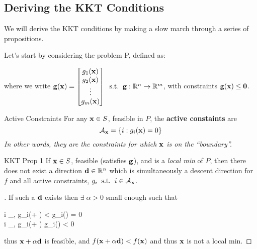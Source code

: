 \subsection{Deriving the KKT Conditions}

We will derive the KKT conditions by making a slow march through
a series of propositions.

Let's start by considering the problem P, defined as:

where we write $\mathbf{g}(\mathbf{x}) = \begin{bmatrix} g_1(\mathbf{x}) \\ g_2(\mathbf{x}) \\ \vdots \\ g_m(\mathbf{x}) \end{bmatrix} 
\;\; \text{s.t.} \;\; \mathbf{g}: \mathbb{R}^n \rightarrow \mathbb{R}^m$, with constraints $\mathbf{g}(\mathbf{x}) \leq \mathbf{0}$.

\begin{defn}{Active Constraints}{}
For any $\mathbf{x} \in S$, feasible in $P$,
the \textbf{active constaints} are 
\[
	\mathcal{A}_{\mathbf{x}} = \{ i : g_i(\mathbf{x}) = 0\}
\]
\textit{In other words, they are the constraints for which $\mathbf{x}$ is on the ``boundary''.}
\end{defn}

\begin{prop}{KKT Prop 1}{}
If $\mathbf{x} \in S$, feasible (satisfies $\mathbf{g}$), and is a \textit{local min}
of $P$, then there does not exist a direction $\mathbf{d} \in \mathbb{R}^n$ which
is simultaneously a descent direction for $f$ and all active constraints, $g_i
\;\; \text{s.t.} \;\; i \in \mathcal{A}_{\mathbf{x}}$.
\end{prop}

\begin{proof}[]
If such a $\mathbf{d}$ exists then $\exists \; \alpha > 0$ small enough such that
\begin{frml}
	\forall i \in {}_\vx, g_i(\vx + \alpha\vd) < g_i(\vx) = 0  \\
	\forall i \notin {}_\vx, g_i(\vx + \alpha\vd) 
	\approx g_i(\vx) < 0 \\
\end{frml}
thus $\mathbf{x} + \alpha\mathbf{d}$ is feasible, and $f(\mathbf{x} + \alpha\mathbf{d}) < f(\mathbf{x})$
and thus $\mathbf{x}$ is not a local min.
\end{proof}

